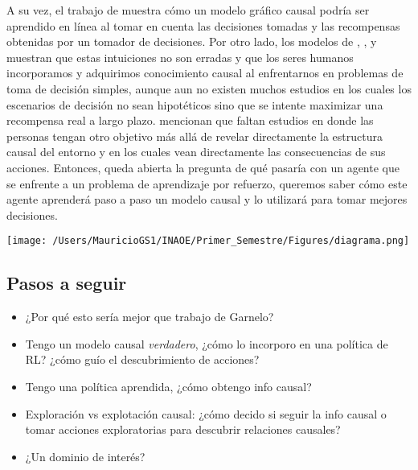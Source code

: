 \documentclass[11pt]{article}
\theoremstyle{plain}
\begin{document}
A su vez, el trabajo de \cite{wellen2012learning} muestra cómo un modelo gráfico causal podría ser aprendido en línea al tomar en cuenta las decisiones tomadas y las recompensas obtenidas por un tomador de decisiones. Por otro lado, los modelos de \cite{sloman2006causal}, \cite{meder2008inferring}, \cite{hagmayer2009decision} y \cite{hagmayer2013repeated} muestran que estas intuiciones no son erradas y que los seres humanos incorporamos y adquirimos conocimiento causal al enfrentarnos en problemas de toma de decisión simples, aunque aun no existen muchos estudios en los cuales los escenarios de decisión no sean hipotéticos sino que se intente maximizar una recompensa real a largo plazo. \cite{hagmayer2013repeated} mencionan que faltan estudios en donde las personas tengan otro objetivo más allá de revelar directamente la estructura causal del entorno y en los cuales vean directamente las consecuencias de sus acciones. Entonces, queda abierta la pregunta de qué pasaría con un agente que se enfrente a un problema de aprendizaje por refuerzo, queremos saber cómo este agente aprenderá paso a paso un modelo causal y lo utilizará para tomar mejores decisiones.
\begin{center}
\texttt{[image: /Users/MauricioGS1/INAOE/Primer\_Semestre/Figures/diagrama.png]}
\end{center}
\subsection{Pasos a seguir}
\begin{itemize}
\item ¿Por qué esto sería mejor que trabajo de Garnelo?
\item Tengo un modelo causal \textit{verdadero}, ¿cómo lo incorporo en una política de RL? ¿cómo guío el descubrimiento de acciones? 
\item Tengo una política aprendida, ¿cómo obtengo info causal?
\item Exploración vs explotación causal: ¿cómo decido si seguir la info causal o tomar acciones exploratorias para descubrir relaciones causales? 
\item ¿Un dominio de interés? 
\end{itemize}
\end{document}
